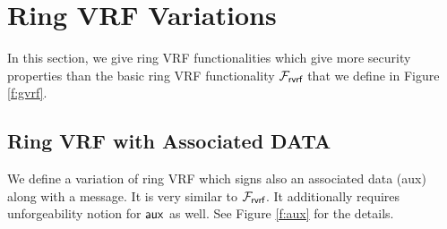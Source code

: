 \section{Ring VRF Variations}
\label{sec:morefuncs}
In this section, we give ring VRF functionalities which give more security properties than the basic ring VRF functionality $ \mathcal{F}_{\textsf{rvrf}} $ that we define in Figure \ref{f:gvrf}.

\newcommand{\faux}{\fgvrf^{\mathsf{aux}}}
\subsection{Ring VRF with Associated DATA}
We define a variation of ring VRF which signs also an associated data (aux) along with a message. It is very similar to $ \mathcal{F}_{\textsf{rvrf}} $. It additionally requires unforgeability notion for $ \mathsf{aux} $ as well. See Figure \ref{f:aux} for the details.
